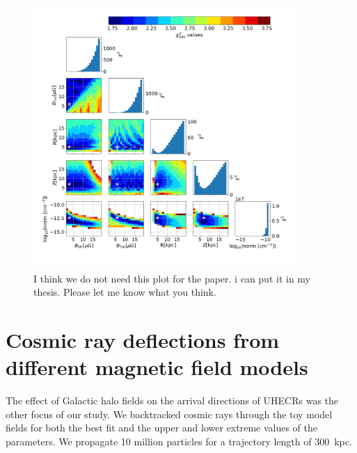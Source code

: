 \documentclass[12pt, a4 paper]{article}
\newcommand{\Vasu}[1]{{\color{purple}#1}}
\begin{document}
\begin{figure}[h!]
        \centering
        \includegraphics[width = 10cm]{Images/Jan20_Chsq_dof_Para_Scan_1_9_3_elec_den_norm_10GeV.png}
        \caption{\Vasu{I think we do not need this plot for the paper. i can put it in my thesis. Please let me know what you think.}}
        \label{fig:my_label}
\end{figure}


\newpage



\section{Cosmic ray deflections from different magnetic field models}
\label{Deflections}

The effect of Galactic halo fields on the arrival directions of UHECRs was the other focus of our study. We backtracked cosmic rays through the toy model fields for both the best fit and the upper and lower extreme values of the parameters. We propagate 10 million particles for a trajectory length of 300~kpc.
\end{document}
